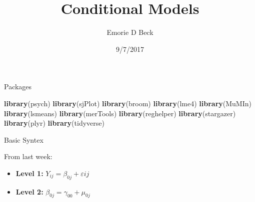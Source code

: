 \documentclass[ignorenonframetext,]{beamer}
\title{Conditional Models}
\author{Emorie D Beck}
\date{9/7/2017}
\newenvironment{Shaded}{\begin{snugshade}}{\end{snugshade}}
\newcommand{\KeywordTok}[1]{\textcolor[rgb]{0.13,0.29,0.53}{\textbf{{#1}}}}
\newcommand{\NormalTok}[1]{{#1}}
\begin{document}
\frame{\titlepage}

\begin{frame}[fragile]{Packages}

\begin{Shaded}
\begin{Highlighting}[]
\KeywordTok{library}\NormalTok{(psych)}
\KeywordTok{library}\NormalTok{(sjPlot)}
\KeywordTok{library}\NormalTok{(broom)}
\KeywordTok{library}\NormalTok{(lme4)}
\KeywordTok{library}\NormalTok{(MuMIn)}
\KeywordTok{library}\NormalTok{(lsmeans)}
\KeywordTok{library}\NormalTok{(merTools)}
\KeywordTok{library}\NormalTok{(reghelper)}
\KeywordTok{library}\NormalTok{(stargazer)}
\KeywordTok{library}\NormalTok{(plyr)}
\KeywordTok{library}\NormalTok{(tidyverse)}
\end{Highlighting}
\end{Shaded}

\end{frame}

\begin{frame}{Basic Syntex}

From last week:

\begin{itemize}
  \item \textbf{Level 1:} $Y_{ij} = \beta_{0j} + \varepsilon{ij}$
  \item \textbf{Level 2:} $\beta_{0j} = \gamma_{00} + \mu_{0j}$
\end{itemize}

\end{frame}
\end{document}
